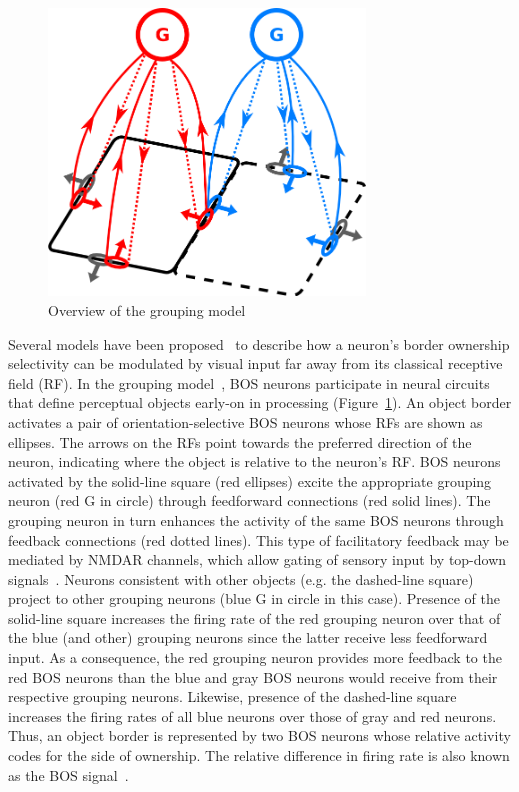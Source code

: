 \begin{figure}[t]
\centering
\includegraphics[width=0.75\textwidth]{Intro/figs/groupingcircuit}
\makeatletter
\let\@currsize\normalsize
\caption{Overview of the grouping model}
\label{fig:GroupingModel}
\end{figure}

Several models have been proposed~\citep{Zhaoping05, Sakai_Nishimura06,Craft_etal07, Layton_etal12} to describe how a neuron's border ownership selectivity can be modulated by visual input far away from its classical receptive field (RF). In the grouping model~\citep{Craft_etal07}, BOS neurons participate in neural circuits that define perceptual objects early-on in processing (Figure~\ref{fig:GroupingModel}). An object border activates a pair of orientation-selective BOS neurons whose RFs are shown as ellipses. The arrows on the RFs point towards the preferred direction of the neuron, indicating where the object is relative to the neuron's RF. BOS neurons activated by the solid-line square (red ellipses) excite the appropriate grouping neuron (red G in circle) through feedforward connections (red solid lines). The grouping neuron in turn enhances the activity of the same BOS neurons through feedback connections (red dotted lines). This type of facilitatory feedback may be mediated by NMDAR channels, which allow gating of sensory input by top-down signals~\citep{Palmer_etal14}. Neurons consistent with other objects (e.g. the dashed-line square) project to other grouping neurons (blue G in circle in this case). Presence of the solid-line square increases the firing rate of the red grouping neuron over that of the blue (and other) grouping neurons since the latter receive less feedforward input. As a consequence, the red grouping neuron provides more feedback to the red BOS neurons than the blue and gray BOS neurons would receive from their respective grouping neurons. Likewise, presence of the dashed-line square increases the firing rates of all blue neurons over those of gray and red neurons. Thus, an object border is represented by two BOS neurons whose relative activity codes for the side of ownership. The relative difference in firing rate is also known as the BOS signal~\citep{Zhou_etal00}.

